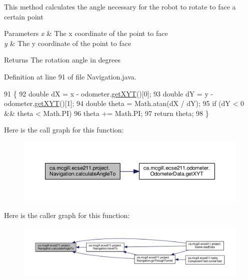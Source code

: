 This method calculates the angle necessary for the robot to rotate to face a certain point


\begin{DoxyParams}{Parameters}
{\em x} & The x coordinate of the point to face \\
\hline
{\em y} & The y coordinate of the point to face \\
\hline
\end{DoxyParams}
\begin{DoxyReturn}{Returns}
The rotation angle in degrees 
\end{DoxyReturn}


Definition at line 91 of file Navigation.\+java.


\begin{DoxyCode}
91                                                      \{
92     \textcolor{keywordtype}{double} dX = x - odometer.\hyperlink{classca_1_1mcgill_1_1ecse211_1_1odometer_1_1_odometer_data_a8f40f0264c68f0cbed4fff1723ae7863}{getXYT}()[0];
93     \textcolor{keywordtype}{double} dY = y - odometer.\hyperlink{classca_1_1mcgill_1_1ecse211_1_1odometer_1_1_odometer_data_a8f40f0264c68f0cbed4fff1723ae7863}{getXYT}()[1];
94     \textcolor{keywordtype}{double} theta = Math.atan(dX / dY);
95     \textcolor{keywordflow}{if} (dY < 0 && theta < Math.PI)
96       theta += Math.PI;
97     \textcolor{keywordflow}{return} theta;
98   \}
\end{DoxyCode}
Here is the call graph for this function\+:\nopagebreak
\begin{figure}[H]
\begin{center}
\leavevmode
\includegraphics[width=350pt]{classca_1_1mcgill_1_1ecse211_1_1project_1_1_navigation_a4376e54162df8f123ca3b52e4fd2f38d_cgraph}
\end{center}
\end{figure}
Here is the caller graph for this function\+:\nopagebreak
\begin{figure}[H]
\begin{center}
\leavevmode
\includegraphics[width=350pt]{classca_1_1mcgill_1_1ecse211_1_1project_1_1_navigation_a4376e54162df8f123ca3b52e4fd2f38d_icgraph}
\end{center}
\end{figure}
